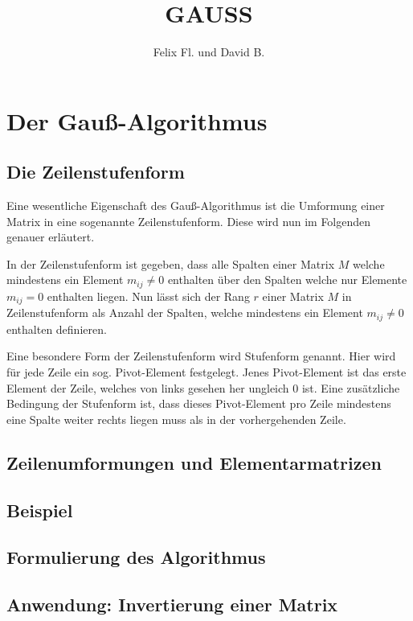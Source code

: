 \documentclass{scrartcl}
\title{GAUSS}
\author{Felix Fl. und David B.}
\begin{document}
\maketitle

\tableofcontents
\newpage

\section{Der Gauß-Algorithmus}


\subsection{Die Zeilenstufenform}
Eine wesentliche Eigenschaft des Gauß-Algorithmus ist die Umformung einer Matrix in eine sogenannte Zeilenstufenform. Diese wird nun im Folgenden genauer erläutert.

In der Zeilenstufenform ist gegeben, dass alle Spalten einer Matrix $M$ welche mindestens ein Element $m_{ij} \neq 0$ enthalten über den Spalten welche nur Elemente $m_{ij} = 0$ enthalten liegen.
Nun lässt sich der Rang $r$ einer Matrix $M$ in Zeilenstufenform als Anzahl der Spalten, welche mindestens ein Element $m_{ij} \neq 0$ enthalten definieren.

Eine besondere Form der Zeilenstufenform wird Stufenform genannt. Hier wird für jede Zeile ein sog. Pivot-Element festgelegt.
Jenes Pivot-Element ist das erste Element der Zeile, welches von links gesehen her ungleich 0 ist. Eine zusätzliche Bedingung der Stufenform ist, dass dieses Pivot-Element pro Zeile mindestens eine Spalte weiter rechts liegen muss als in der vorhergehenden Zeile.

\subsection{Zeilenumformungen und Elementarmatrizen}


\subsection{Beispiel}


\subsection{Formulierung des Algorithmus}


\subsection{Anwendung: Invertierung einer Matrix}

\end{document}

